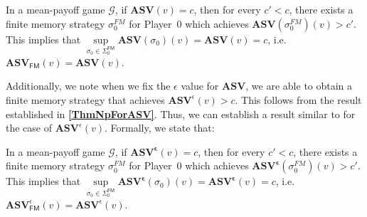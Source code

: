 \begin{corollary}
\label{CorASVEqASVFinNonEps}
In a mean-payoff game $\mathcal{G}$, if $\mathbf{ASV}(v) = c$, then for every $c' < c$, there exists a finite memory strategy $\sigma_0^{FM}$ for Player~0 which achieves $\mathbf{ASV}(\sigma_0^{FM})(v) > c'$. This implies that $\sup\limits_{\sigma_0 \in \Sigma_0^{\mathsf{FM}}} \mathbf{ASV}(\sigma_0)(v) = \mathbf{ASV}(v) = c$, i.e. $\mathbf{ASV}_{\mathsf{FM}}(v) = \mathbf{ASV}(v)$.
\end{corollary}

Additionally, we note when we fix the $\epsilon$ value for $\mathbf{ASV}$, we are able to obtain a finite memory strategy that achieves $\mathbf{ASV}^{\epsilon}(v) > c$. This follows from the result established in \textbf{\cref{ThmNpForASV}}. Thus, we can establish a result similar to \textbf{} for the case of $\mathbf{ASV}^{\epsilon}(v)$. Formally, we state that:

\begin{corollary}
\label{CorASVEqASVFin}
In a mean-payoff game $\mathcal{G}$, if $\mathbf{ASV^{\epsilon}}(v) = c$, then for every $c' < c$, there exists a finite memory strategy $\sigma_0^{FM}$ for Player~0 which achieves $\mathbf{ASV^{\epsilon}}(\sigma_0^{FM})(v) > c'$. This implies that $\sup\limits_{\sigma_0 \in \Sigma_0^{\mathsf{FM}}} \mathbf{ASV^{\epsilon}}(\sigma_0)(v) = \mathbf{ASV^{\epsilon}}(v) = c$, i.e. $\mathbf{ASV}^{\epsilon}_{\mathsf{FM}}(v) = \mathbf{ASV}^{\epsilon}(v)$.
\end{corollary}